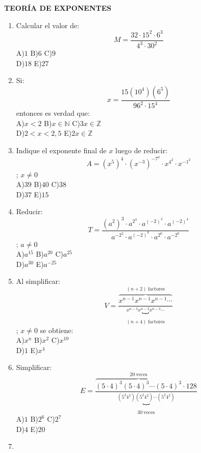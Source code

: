 \documentclass[
  10pt,
]{article}
\author{}
\date{}
\begin{document}
\textbf{TEORÍA DE EXPONENTES}

\begin{enumerate}
\def\labelenumi{\arabic{enumi}.}
\item
  Calcular el valor de:\\
  \[M = \frac{32 \cdot 15^{2} \cdot 6^{3}}{4^{3} \cdot 30^{2}}
  \]A)\(1\) B)\(6\) C)\(9\)\\
  D)\(18\) E)\(27\)
\item
  Si:\\
  \[x = \frac{15\left( 10^{4} \right)\left( 6^{5} \right)}{96^{2} \cdot 15^{4}}
  \] entonces es verdad que:\\
  A)\(x < 2\) B)\(x\mathbb{\in N}\) C)\(3x\mathbb{\in Z}\)\\
  D)\(2 < x < 2,5\) E)\(2x\mathbb{\in Z}\)
\item
  Indique el exponente final de \(x\) luego de reducir:\\
  \[A = \left( x^{5} \right)^{4} \cdot \left( x^{- 3} \right)^{- 7^{0}} \cdot x^{4^{2}} \cdot x^{- 1^{2}}
  \]; \(x \neq 0\)\\
  A)\(39\) B)\(40\) C)\(38\)\\
  D)\(37\) E)\(15\)
\item
  Reducir:\\
  \[T = \frac{\left( a^{2} \right)^{3} \cdot a^{2^{3}} \cdot a^{( - 2)^{3}} \cdot a^{( - 2)^{4}}}{a^{- 2^{2}} \cdot a^{( - 2)^{0}} \cdot a^{2^{0}} \cdot a^{- 2^{0}}}
  \]; \(a \neq 0\)\\
  A)\(a^{15}\) B)\(a^{20}\) C)\(a^{25}\)\\
  D)\(a^{30}\) E)\(a^{- 25}\)
\item
  Al simplificar:\\
  \[V = \frac{\overset{(n + 2)\ \text{factores}}{\overbrace{x^{n - 1}x^{n - 1}x^{n - 1}\cdots}}}{\underset{(n + 4)\ \text{factores}}{\overset{x^{n - 3}x^{n - 3}x^{n - 3}\cdots}{︸}}}
  \]; \(x \neq 0\) se obtiene:\\
  A)\(x^{n}\) B)\(x^{2}\) C)\(x^{10}\)\\
  D)\(1\) E)\(x^{4}\)
\item
  Simplificar:\\
  \[E = \frac{\overset{20\ \text{veces}}{\overbrace{(5 \cdot 4)^{3}(5 \cdot 4)^{3}\cdots(5 \cdot 4)^{3}}} \cdot 128}{\underset{30\ \text{veces}}{\overset{\left( 5^{2}4^{2} \right)\left( 5^{2}4^{2} \right)\cdots\left( 5^{2}4^{2} \right)}{︸}}}
  \]A)\(1\) B)\(2^{6}\) C)\(2^{7}\)\\
  D)\(4\) E)\(20\)
\item

\end{enumerate}
\end{document}
